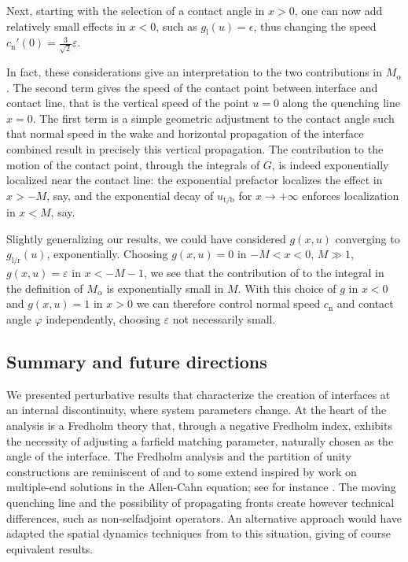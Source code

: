 \documentclass[10pt]{article}
\begin{document}
Next, starting with the selection of a contact angle in $x>0$, one can now add relatively small effects in $x<0$, such as $g_\mathrm{l}(u)=\epsilon$, thus changing the speed $c_\mathrm{n}'(0)=\frac{3}{\sqrt{2}}\varepsilon$. 

In fact, these considerations give an interpretation to the two contributions in $M_\alpha$. The second term gives the speed of the contact point between interface and contact line, that is the vertical speed of the point $u=0$ along the quenching line $x=0$. The first term is a simple geometric adjustment to the contact angle such that normal speed in the wake and horizontal propagation of the interface combined result in precisely this vertical propagation.  The contribution to the motion of the contact point, through the integrals of $G$, is indeed exponentially localized near the contact line: the exponential prefactor localizes the effect in $x>-M$, say, and the exponential decay of $u_\mathrm{t/b}$ for $x\to+\infty$ enforces localization in $x<M$, say. 

Slightly generalizing our results, we could have considered $g(x,u)$ converging to $g_\mathrm{l/r}(u)$, exponentially. Choosing $g(x,u)=0$ in $-M<x<0$, $M\gg 1$, $g(x,u)=\varepsilon$ in $x<-M-1$, we see that the contribution of to the integral in the definition of $M_\alpha$ is exponentially small in $M$. With this choice of $g$ in $x<0$ and $g(x,u)=1$ in $x>0$ we can therefore control normal speed $c_\mathrm{n}$ and contact angle $\varphi$ independently, choosing $\varepsilon$ not necessarily small. 





\subsection{Summary and future directions}\label{s:5.2}

We presented perturbative results that characterize the creation of interfaces at an internal discontinuity, where system parameters change. At the heart of the analysis is a Fredholm theory that, through a negative Fredholm index, exhibits the necessity of adjusting a farfield matching parameter, naturally chosen as the angle of the interface. The Fredholm analysis and the partition of unity constructions are reminiscent of and to some extend inspired by work on multiple-end solutions in the Allen-Cahn equation; see for instance \cite{pino}. The moving quenching line and the possibility of propagating fronts create however technical differences, such as non-selfadjoint operators. An alternative approach would have adapted the spatial dynamics techniques from \cite{Haragus_Scheel_corner} to this situation, giving of course equivalent results. 
\end{document}
